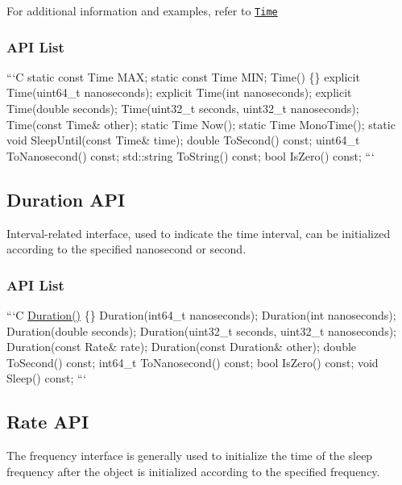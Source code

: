{\ttfamily  For additional information and examples, refer to \href{#use-of-time}{\tt Time}}

{\ttfamily \subsubsection*{A\-P\-I List}}

{\ttfamily }

{\ttfamily ```\-C static const Time M\-A\-X; static const Time M\-I\-N; Time() \{\} explicit Time(uint64\-\_\-t nanoseconds); explicit Time(int nanoseconds); explicit Time(double seconds); Time(uint32\-\_\-t seconds, uint32\-\_\-t nanoseconds); Time(const Time\& other); static Time Now(); static Time Mono\-Time(); static void Sleep\-Until(const Time\& time); double To\-Second() const; uint64\-\_\-t To\-Nanosecond() const; std\-::string To\-String() const; bool Is\-Zero() const; ```}

{\ttfamily \subsection*{Duration A\-P\-I}}

{\ttfamily  Interval-\/related interface, used to indicate the time interval, can be initialized according to the specified nanosecond or second.}

{\ttfamily \subsubsection*{A\-P\-I List}}

{\ttfamily }

{\ttfamily ```\-C \hyperlink{namespaceapollo_1_1cyber_1_1croutine_aae31aee73e46be40ab635496b4d9d1e2}{Duration()} \{\} Duration(int64\-\_\-t nanoseconds); Duration(int nanoseconds); Duration(double seconds); Duration(uint32\-\_\-t seconds, uint32\-\_\-t nanoseconds); Duration(const Rate\& rate); Duration(const Duration\& other); double To\-Second() const; int64\-\_\-t To\-Nanosecond() const; bool Is\-Zero() const; void Sleep() const; ```}

{\ttfamily \subsection*{Rate A\-P\-I}}

{\ttfamily  The frequency interface is generally used to initialize the time of the sleep frequency after the object is initialized according to the specified frequency.}

